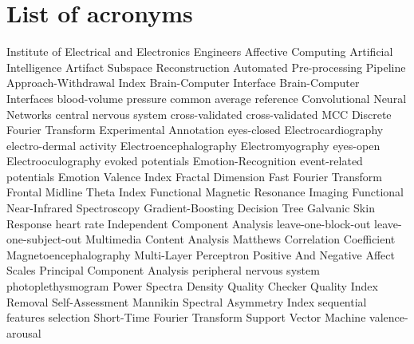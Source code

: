 \chapter{List of acronyms}

\begin{acronym}[TDMAAA]

					{Institute of Electrical and Electronics Engineers}
					{Affective Computing}	
					{Artificial Intelligence}
    		{Artifact Subspace Reconstruction}
    		{Automated Pre-processing Pipeline}
    		{Approach-Withdrawal Index}
    			   {Brain-Computer Interface}
    			   {Brain-Computer Interfaces}
    		{blood-volume pressure}
    		{common average reference}
    		{Convolutional Neural Networks}
    		{central nervous system}
    		{cross-validated}
    		{cross-validated MCC}
    		{Discrete Fourier Transform}
    		{Experimental Annotation}
    		{eyes-closed}
    				{Electrocardiography}
    		{electro-dermal activity}
    			   {Electroencephalography}
    		{Electromyography}
    		{eyes-open}
    	 	{Electrooculography}
               {evoked potentials}
    			   {Emotion-Recognition}
    		  {event-related potentials}
    		{Emotion Valence Index}
    		{Fractal Dimension}
    		{Fast Fourier Transform}
    		{Frontal Midline Theta Index}
               {Functional Magnetic Resonance Imaging}
              {Functional Near-Infrared Spectroscopy}
    		{Gradient-Boosting Decision Tree}
    		{Galvanic Skin Response}
    		{heart rate}
    		{Independent Component Analysis}
    		{leave-one-block-out}
    		{leave-one-subject-out}
    		{Multimedia Content Analysis}	
    		{Matthews Correlation Coefficient}
               {Magnetoencephalography}
    		{Multi-Layer Perceptron}
    		{Positive And Negative Affect Scales}
    		{Principal Component Analysis}
    		{peripheral nervous system}
            {photoplethysmogram}
    		{Power Spectra Density}
    		{Quality Checker}
    		{Quality Index Removal}
    		{Self-Assessment Mannikin}
    		{Spectral Asymmetry Index}
    		{sequential features selection}
       {Short-Time Fourier Transform}
    		{Support Vector Machine}
            {valence-arousal}  
    
\end{acronym}

